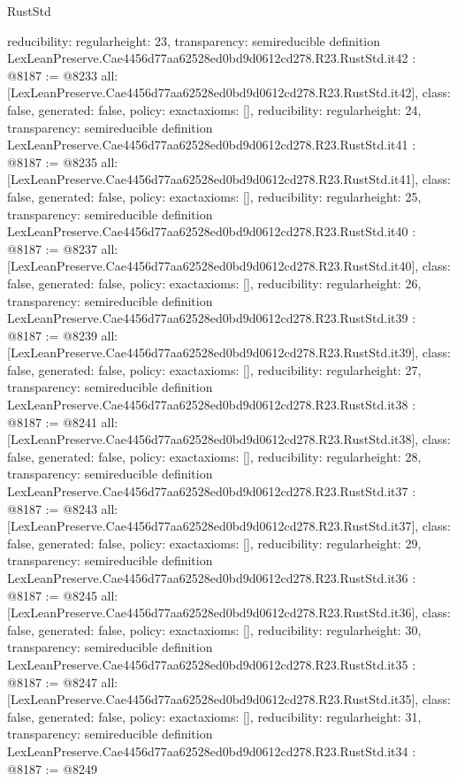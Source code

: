 \begin{lexlean}{RustStd}
\begin{coremodule}
{  reducibility: regular{height: 23},
  transparency: semireducible
}
definition LexLeanPreserve.Cae4456d77aa62528ed0bd9d0612cd278.R23.RustStd.it42 : @8187 := @8233 {
  all: [LexLeanPreserve.Cae4456d77aa62528ed0bd9d0612cd278.R23.RustStd.it42],
  class: false,
  generated: false,
  policy: exact{axioms: []},
  reducibility: regular{height: 24},
  transparency: semireducible
}
definition LexLeanPreserve.Cae4456d77aa62528ed0bd9d0612cd278.R23.RustStd.it41 : @8187 := @8235 {
  all: [LexLeanPreserve.Cae4456d77aa62528ed0bd9d0612cd278.R23.RustStd.it41],
  class: false,
  generated: false,
  policy: exact{axioms: []},
  reducibility: regular{height: 25},
  transparency: semireducible
}
definition LexLeanPreserve.Cae4456d77aa62528ed0bd9d0612cd278.R23.RustStd.it40 : @8187 := @8237 {
  all: [LexLeanPreserve.Cae4456d77aa62528ed0bd9d0612cd278.R23.RustStd.it40],
  class: false,
  generated: false,
  policy: exact{axioms: []},
  reducibility: regular{height: 26},
  transparency: semireducible
}
definition LexLeanPreserve.Cae4456d77aa62528ed0bd9d0612cd278.R23.RustStd.it39 : @8187 := @8239 {
  all: [LexLeanPreserve.Cae4456d77aa62528ed0bd9d0612cd278.R23.RustStd.it39],
  class: false,
  generated: false,
  policy: exact{axioms: []},
  reducibility: regular{height: 27},
  transparency: semireducible
}
definition LexLeanPreserve.Cae4456d77aa62528ed0bd9d0612cd278.R23.RustStd.it38 : @8187 := @8241 {
  all: [LexLeanPreserve.Cae4456d77aa62528ed0bd9d0612cd278.R23.RustStd.it38],
  class: false,
  generated: false,
  policy: exact{axioms: []},
  reducibility: regular{height: 28},
  transparency: semireducible
}
definition LexLeanPreserve.Cae4456d77aa62528ed0bd9d0612cd278.R23.RustStd.it37 : @8187 := @8243 {
  all: [LexLeanPreserve.Cae4456d77aa62528ed0bd9d0612cd278.R23.RustStd.it37],
  class: false,
  generated: false,
  policy: exact{axioms: []},
  reducibility: regular{height: 29},
  transparency: semireducible
}
definition LexLeanPreserve.Cae4456d77aa62528ed0bd9d0612cd278.R23.RustStd.it36 : @8187 := @8245 {
  all: [LexLeanPreserve.Cae4456d77aa62528ed0bd9d0612cd278.R23.RustStd.it36],
  class: false,
  generated: false,
  policy: exact{axioms: []},
  reducibility: regular{height: 30},
  transparency: semireducible
}
definition LexLeanPreserve.Cae4456d77aa62528ed0bd9d0612cd278.R23.RustStd.it35 : @8187 := @8247 {
  all: [LexLeanPreserve.Cae4456d77aa62528ed0bd9d0612cd278.R23.RustStd.it35],
  class: false,
  generated: false,
  policy: exact{axioms: []},
  reducibility: regular{height: 31},
  transparency: semireducible
}
definition LexLeanPreserve.Cae4456d77aa62528ed0bd9d0612cd278.R23.RustStd.it34 : @8187 := @8249 {
}
\end{coremodule}
\end{lexlean}
